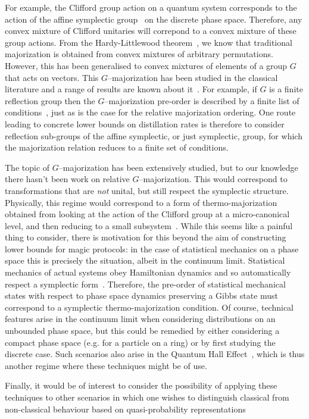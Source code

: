 \documentclass[pra,
aps,
twocolumn,
superscriptaddress,
groupedaddress,
nofootinbib,
reprint
]{revtex4-1}
\begin{document}
For example, the Clifford group action on a quantum system corresponds to the action of the affine symplectic group~\cite{cit:gross3, cit:bengtsson} on the discrete phase space. Therefore, any convex mixture of Clifford unitaries will correpond to a convex mixture of these group actions. From the Hardy-Littlewood theorem~\cite{hardy_1952}, we know that traditional majorization is obtained from convex mixtures of arbitrary permutations. However, this has been generalised to convex mixtures of elements of a group $G$ that acts on vectors. This $G$--majorization has been studied in the classical literature and a range of results are known about it~\cite{giovagnoli_1985, steerneman_1990, eaton_1977}. For example, if $G$ is a finite reflection group then the $G$--majorization pre-order is described by a finite list of conditions~\cite{giovagnoli_1985}, just as is the case for the relative majorization ordering. One route leading to concrete lower bounds on distillation rates is therefore to consider reflection sub-groups of the affine symplectic, or just symplectic, group, for which the majorization relation reduces to a finite set of conditions.
  
The topic of $G$--majorization has been extensively studied, but to our knowledge there hasn't been work on relative $G$--majorization. This would correspond to transformations that are \emph{not} unital, but still respect the symplectic structure. Physically, this regime would correspond to a form of thermo-majorization obtained from looking at the action of the Clifford group at a micro-canonical level, and then reducing to a small subsystem~\cite{cit:lostaglio, Pathria_1997}. While this seems like a painful thing to consider, there is motivation for this beyond the aim of constructing lower bounds for magic protocols: in the case of statistical mechanics on a phase space this is precisely the situation, albeit in the continuum limit. Statistical mechanics of actual systems obey Hamiltonian dynamics and so automatically respect a symplectic form~\cite{Pathria_1997}. Therefore, the pre-order of statistical mechanical states with respect to phase space dynamics preserving a Gibbs state must correspond to a symplectic thermo-majorization condition. Of course, technical features arise in the continuum limit when considering distributions on an unbounded phase space, but this could be remedied by either considering a compact phase space (e.g. for a particle on a ring) or by first studying the discrete case. Such scenarios also arise in the Quantum Hall Effect~\cite{Klitzing_1980}, which is thus another regime where these techniques might be of use.

Finally, it would be of interest to consider the possibility of applying these techniques to other scenarios in which one wishes to distinguish classical from non-classical behaviour based on quasi-probability representations~\cite{Ferrie_2008, barnett_1997}



%


\appendix

\end{document}
